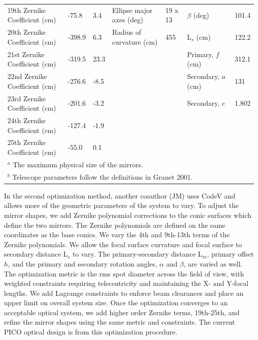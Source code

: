 \documentclass[]{spie}  %
\begin{document}
\begin{table}[ht]
\begin{adjustbox}{width=1.05\textwidth}
\begin{tabular}{|l|llll||ll|}
19th Zernike Coefficient (cm) & -75.8             & 3.4               & Ellipse major axes (deg)  & 19 x 13  & $\beta$  (deg)                 & 101.4 \\   
20th Zernike Coefficient (cm) & -398.9            & 6.3               & Radius of curvature (cm)  & 455      & L$_s$ (cm)                     & 122.2 \\   
21st Zernike Coefficient (cm) & -319.5            & 23.3              &                           &          & Primary, $f$ (cm)              & 312.1 \\   
22nd Zernike Coefficient (cm) & -276.6            & -8.5              &                           &          & Secondary, $a$ (cm)            & 131   \\   
23rd Zernike Coefficient (cm) & -201.6            & -3.2              &                           &          & Secondary, $e$                 &  1.802  \\
24th Zernike Coefficient (cm) & -127.4            & -1.9              &                           &          &                                &       \\
25th Zernike Coefficient (cm) & -55.0             & 0.1               &                           &          &                                &       \\\hline
\multicolumn{7}{l}{\footnotesize  $^a$ The maximum physical size of the mirrors.}\\
\multicolumn{7}{l}{\footnotesize  $^b$ Telescope parameters follow the definitions in Granet 2001.\cite{granet2001}} \\
\end{tabular}
\end{adjustbox}
\end{table}

In the second optimization method, another coauthor (JM) uses CodeV and allows more of the geometric 
parameters of the system to vary.  To adjust the 
mirror shapes, we add Zernike polynomial corrections to the conic surfaces which define the two mirrors.
The Zernike polynomials are defined on the same coordinates as the base conics.  
We vary the 4th and 9th-13th terms of the Zernike polynomials. We allow the focal surface curvature 
and focal surface to secondary distance L$_s$ to vary.  The primary-secondary distance L$_m$, primary offset $h$, 
and the primary and secondary rotation angles, $\alpha$ and $\beta$, are varied as well.  The optimization 
metric is the rms spot diameter across the field of view, with weighted constraints requiring telecentricity and 
maintaining the X- and Y-focal lengths.  We add Lagrange constraints 
to enforce beam clearances and place an upper limit on overall system size.  Once the optimization converges to 
an acceptable optical system, we add higher order Zernike terms, 19th-25th, and refine 
the mirror shapes using the same metric and constraints. 
The current PICO optical design is from this optimization procedure.
\end{document}
